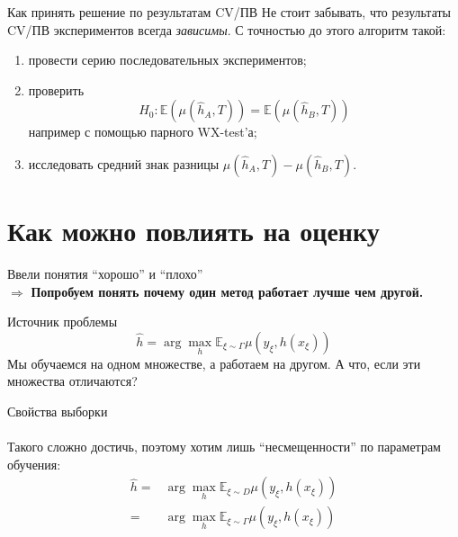 \documentclass[14pt, fleqn, xcolor={dvipsnames, table}]{beamer}
\begin{document}
\begin{frame}{Как принять решение по результатам CV/ПВ}
Не стоит забывать, что результаты CV/ПВ экспериментов всегда {\color{red} \em зависимы}. С точностью до этого алгоритм такой:
\small
\begin{enumerate}
  \item провести серию последовательных экспериментов;
  \item проверить
  $$H_0: \mathbb{E}\left(\mu(\hat{h}_A, T)\right) = \mathbb{E}\left(\mu(\hat{h}_B, T)\right)$$
  например с помощью парного WX-test'а;
  \item исследовать средний знак разницы $\mu(\hat{h}_A, T) - \mu(\hat{h}_B, T)$.
\end{enumerate}

\end{frame}

\section{Как можно повлиять на оценку}

\begin{frame}{}
\Large
Ввели понятия ``хорошо'' и ``плохо''\\
$\Rightarrow$ \bf Попробуем понять почему один метод работает лучше чем другой.
\end{frame}

\begin{frame}{Источник проблемы}
$$
\hat{h} = \arg \max_{h} \mathbb{E}_{\xi \sim \Gamma}\mu(y_{\xi}, h(x_{\xi}))
$$
Мы обучаемся на одном множестве, а работаем на другом. А что, если эти множества отличаются?
\end{frame}

\begin{frame}{Свойства выборки}
\\
\\
\flushleft
Такого сложно достичь, поэтому хотим лишь ``несмещенности'' по параметрам обучения:
\small
$$\begin{array}{rl}
\hat{h} =& \arg \max_{h} \mathbb{E}_{\xi \sim D} \mu(y_{\xi}, h(x_{\xi})) \\
    =& \arg \max_{h} \mathbb{E}_{\xi \sim \Gamma} \mu(y_{\xi}, h(x_{\xi}))
\end{array}$$
\end{frame}
\end{document}
